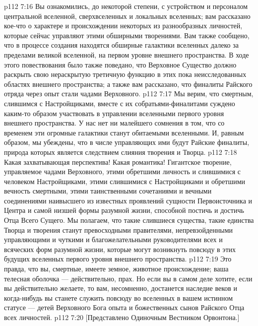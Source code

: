 \vs p112 7:16 Вы ознакомились, до некоторой степени, с устройством и персоналом центральной вселенной, сверхвселенных и локальных вселенных; вам рассказано кое\hyp{}что о характере и происхождении некоторых из разнообразных личностей, которые сейчас управляют этими обширными творениями. Вам также сообщено, что в процессе создания находятся обширные галактики вселенных далеко за пределами великой вселенной, на первом уровне внешнего пространства. В ходе этого повествования было также поведано, что Верховное Существо должно раскрыть свою нераскрытую третичную функцию в этих пока неисследованных областях внешнего пространства; а также вам рассказано, что финалиты Райского отряда через опыт стали чадами Верховного.
\vs p112 7:17 Мы верим, что смертным, слившимся с Настройщиками, вместе с их собратьями\hyp{}финалитами суждено каким\hyp{}то образом участвовать в управлении вселенными первого уровня внешнего пространства. У нас нет ни малейшего сомнения в том, что со временем эти огромные галактики станут обитаемыми вселенными. И, равным образом, мы убеждены, что в числе управляющих ими будут Райские финалиты, природа которых является следствием слияния творения и Творца.
\vs p112 7:18 Какая захватывающая перспектива! Какая романтика! Гигантское творение, управляемое чадами Верховного, этими обретшими личность и слившимися с человеком Настройщиками, этими слившимися с Настройщиками и обретшими вечность смертными, этими таинственными сочетаниями и вечными соединениями наивысшего из известных проявлений сущности Первоисточника и Центра и самой низшей формы разумной жизни, способной постичь и достичь Отца Всего Сущего. Мы полагаем, что такие слившиеся существа, такие единства Творца и творения станут превосходными правителями, непревзойденными управляющими и чуткими и благожелательными руководителями всех и всяческих форм разумной жизни, которые могут возникнуть повсюду в этих будущих вселенных первого уровня внешнего пространства.
\vs p112 7:19 \pc Это правда, что вы, смертные, имеете земное, животное происхождение; ваша телесная оболочка --- действительно, прах. Но если вы в самом деле хотите, если вы действительно желаете, то вам, несомненно, достанется наследие веков и когда\hyp{}нибудь вы станете служить повсюду во вселенных в вашем истинном статусе --- детей Верховного Бога опыта и божественных сынов Райского Отца всех личностей.
\vsetoff
\vs p112 7:20 [Представлено Одиночным Вестником Орвонтона.]
